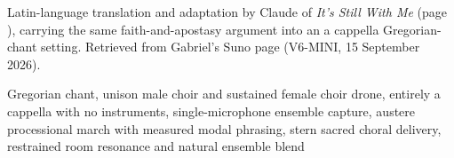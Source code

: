 
\begin{notes}
Latin-language translation and adaptation by Claude of \emph{It's Still With Me} (page \pageref{sec:its-still-with-me}), carrying the same faith-and-apostasy argument into an a cappella Gregorian-chant setting. Retrieved from Gabriel's Suno page (V6-MINI, 15 September 2026).
\end{notes}
\begin{style}
Gregorian chant, unison male choir and sustained female choir drone, entirely a cappella with no instruments, single-microphone ensemble capture, austere processional march with measured modal phrasing, stern sacred choral delivery, restrained room resonance and natural ensemble blend
\end{style}
